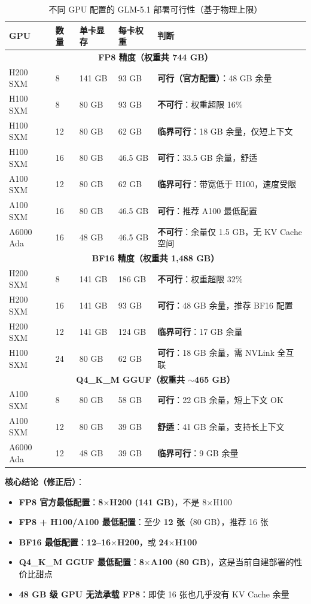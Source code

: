 \documentclass[UTF8,a4paper,10pt,oneside]{ctexart}
\begin{document}
\begin{table}[htbp]
\centering
\caption{不同 GPU 配置的 GLM-5.1 部署可行性（基于物理上限）}
\begin{tabular}{p{2.2cm}p{1.4cm}p{2cm}p{2cm}p{4cm}}
\hline
\textbf{GPU} & \textbf{数量} & \textbf{单卡显存} & \textbf{每卡权重} & \textbf{判断} \\
\hline
\multicolumn{5}{c}{\textbf{FP8 精度（权重共 744 GB）}} \\
\hline
H200 SXM & 8 & 141 GB & 93 GB & \textbf{可行（官方配置）}：48 GB 余量 \\
H100 SXM & 8 & 80 GB & 93 GB & \textbf{不可行}：权重超限 16\% \\
H100 SXM & 12 & 80 GB & 62 GB & \textbf{临界可行}：18 GB 余量，仅短上下文 \\
H100 SXM & 16 & 80 GB & 46.5 GB & \textbf{可行}：33.5 GB 余量，舒适 \\
A100 SXM & 12 & 80 GB & 62 GB & \textbf{临界可行}：带宽低于 H100，速度受限 \\
A100 SXM & 16 & 80 GB & 46.5 GB & \textbf{可行}：推荐 A100 最低配置 \\
A6000 Ada & 16 & 48 GB & 46.5 GB & \textbf{不可行}：余量仅 1.5 GB，无 KV Cache 空间 \\
\hline
\multicolumn{5}{c}{\textbf{BF16 精度（权重共 1,488 GB）}} \\
\hline
H200 SXM & 8 & 141 GB & 186 GB & \textbf{不可行}：权重超限 32\% \\
H200 SXM & 16 & 141 GB & 93 GB & \textbf{可行}：48 GB 余量，推荐 BF16 配置 \\
H200 SXM & 12 & 141 GB & 124 GB & \textbf{临界可行}：17 GB 余量 \\
H100 SXM & 24 & 80 GB & 62 GB & \textbf{可行}：18 GB 余量，需 NVLink 全互联 \\
\hline
\multicolumn{5}{c}{\textbf{Q4\_K\_M GGUF（权重共 $\sim$465 GB）}} \\
\hline
A100 SXM & 8 & 80 GB & 58 GB & \textbf{可行}：22 GB 余量，短上下文 OK \\
A100 SXM & 12 & 80 GB & 39 GB & \textbf{舒适}：41 GB 余量，支持长上下文 \\
A6000 Ada & 12 & 48 GB & 39 GB & \textbf{临界可行}：9 GB 余量 \\
\hline
\end{tabular}
\end{table}

\textbf{核心结论（修正后）}：
\begin{itemize}
    \item \textbf{FP8 官方最低配置}：\textbf{8$\times$H200 (141 GB)}，不是 8$\times$H100
    \item \textbf{FP8 + H100/A100 最低配置}：至少 \textbf{12 张}（80 GB），推荐 16 张
    \item \textbf{BF16 最低配置}：\textbf{12--16$\times$H200}，或 \textbf{24$\times$H100}
    \item \textbf{Q4\_K\_M GGUF 最低配置}：\textbf{8$\times$A100 (80 GB)}，这是当前自建部署的性价比甜点
    \item \textbf{48 GB 级 GPU 无法承载 FP8}：即使 16 张也几乎没有 KV Cache 余量
\end{itemize}
\end{document}
